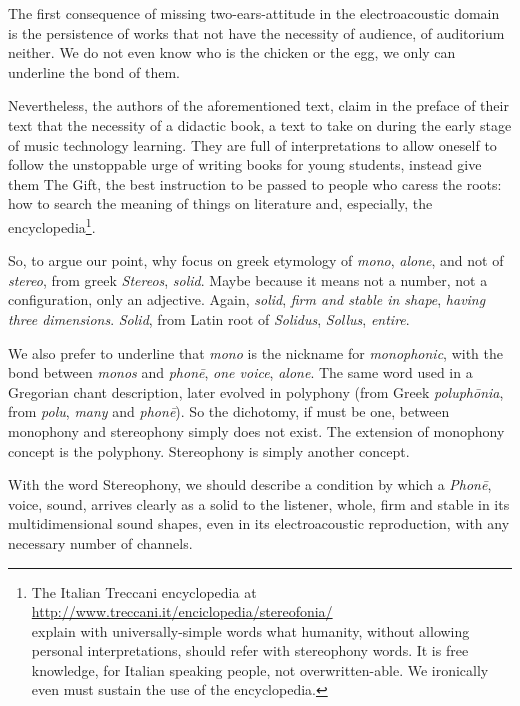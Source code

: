 \documentclass{article}
\begin{document}
The first consequence of missing two-ears-attitude in the electroacoustic domain is the persistence of works that not have the necessity of audience, of auditorium neither. We do not even know who is the chicken or the egg, we only can underline the bond of them.

Nevertheless, the authors \cite{labtec01} of the aforementioned text, claim in the preface of their text that the necessity of a didactic book, a text to take on during the early stage of music technology learning. They are full of interpretations to allow oneself to follow the unstoppable urge of writing books for young students, instead give them The Gift, the best instruction to be passed to people who caress the roots: how to search the meaning of things on literature and, especially, the encyclopedia\footnote{
The Italian Treccani encyclopedia at \\
\url{http://www.treccani.it/enciclopedia/stereofonia/} \\
explain with universally-simple words what humanity, without allowing personal interpretations, should refer with stereophony words. It is free knowledge, for Italian speaking people, not overwritten-able. We ironically even must sustain the use of the encyclopedia.}.

So, to argue our point, why focus on greek etymology of \emph{mono}, \emph{alone}, and not of \emph{stereo}, from greek \emph{Stereos}, \emph{solid}. Maybe because it means not a number, not a configuration, only an adjective. Again, \emph{solid}, \emph{firm and stable in shape}, \emph{having three dimensions}. \emph{Solid}, from Latin root of \emph{Solidus}, \emph{Sollus}, \emph{entire}.

We also prefer to underline that \emph{mono} is the nickname for \emph{monophonic}, with the bond between \emph{monos} and \emph{phon\={e}}, \emph{one voice}, \emph{alone}. The same word used in a Gregorian chant description, later evolved in polyphony (from Greek \emph{poluph\={o}nia}, from \emph{polu}, \emph{many} and \emph{phon\={e}}). So the dichotomy, if must be one, between monophony and stereophony simply does not exist. The extension of monophony concept is the polyphony. Stereophony is simply another concept.

With the word Stereophony, we should describe a condition by which a \emph{Phon\={e}}, voice, sound, arrives clearly as a solid to the listener, whole, firm and stable in its multidimensional sound shapes, even in its electroacoustic reproduction, with any necessary number of channels.
\end{document}
